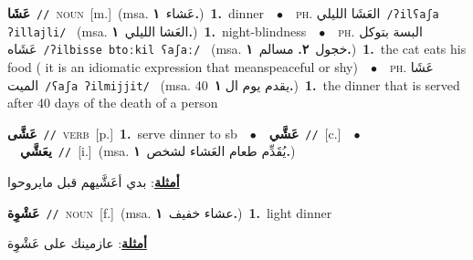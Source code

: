 \documentclass[10pt,a4paper,twoside]{article} %
\begin{document}
\begin{multicols}{2}
{\setlength\topsep{0pt}\textbf{\foreignlanguage{arabic}{عَشَا}}\ {\color{gray}\texttt{//}\color{black}}\ \textsc{noun}\ [m.]\ \color{gray}(msa. \foreignlanguage{arabic}{عَشاء}~\foreignlanguage{arabic}{\textbf{١.}})\color{black}\ \textbf{1.}~dinner\ \ $\bullet$\ \ \textsc{ph.} \color{gray} \foreignlanguage{arabic}{العَشَا الليلي}\color{black}\ {\color{gray}\texttt{/{\sffamily ʔilʕaʃa ʔillajli}/}\color{black}}\ \color{gray} (msa. \foreignlanguage{arabic}{العَشا الليلي}~\foreignlanguage{arabic}{\textbf{١.}})\color{black}\ \textbf{1.}~night-blindness\ \ $\bullet$\ \ \textsc{ph.} \color{gray} \foreignlanguage{arabic}{البسة بتوكل عَشَاه}\color{black}\ {\color{gray}\texttt{/{\sffamily ʔilbisse btoːkil ʕaʃaː}/}\color{black}}\ \color{gray} (msa. \foreignlanguage{arabic}{خجول}~\foreignlanguage{arabic}{\textbf{٢.}}  \foreignlanguage{arabic}{مسالم}~\foreignlanguage{arabic}{\textbf{١.}})\color{black}\ \textbf{1.}~the cat eats his food ( it is an idiomatic expression that meanspeaceful or shy)\ \ $\bullet$\ \ \textsc{ph.} \color{gray} \foreignlanguage{arabic}{عَشَا الميت}\color{black}\ {\color{gray}\texttt{/{\sffamily ʕaʃa ʔilmijjit}/}\color{black}}\ \color{gray} (msa. \foreignlanguage{arabic}{يقدم يوم ال 40}~\foreignlanguage{arabic}{\textbf{١.}})\color{black}\ \textbf{1.}~the dinner that is served after 40 days of the death of a person\ } \vspace{2mm}

{\setlength\topsep{0pt}\textbf{\foreignlanguage{arabic}{عَشَّى}}\ {\color{gray}\texttt{//}\color{black}}\ \textsc{verb}\ [p.]\ \textbf{1.}~serve dinner to sb\ \ $\bullet$\ \ \setlength\topsep{0pt}\textbf{\foreignlanguage{arabic}{عَشَّي}}\ {\color{gray}\texttt{//}\color{black}}\ [c.]\ \ $\bullet$\ \ \setlength\topsep{0pt}\textbf{\foreignlanguage{arabic}{يعَشَّي}}\ {\color{gray}\texttt{//}\color{black}}\ [i.]\ \color{gray}(msa. \foreignlanguage{arabic}{يُقَدِّم طعام العَشاء لشخص}~\foreignlanguage{arabic}{\textbf{١.}})\color{black}\  \begin{flushright}\color{gray}\foreignlanguage{arabic}{\textbf{\underline{\foreignlanguage{arabic}{أمثلة}}}: بدي أعَشَّيهم قبل مايروحوا}\end{flushright}\color{black}} \vspace{2mm}

{\setlength\topsep{0pt}\textbf{\foreignlanguage{arabic}{عَشْوِة}}\ {\color{gray}\texttt{//}\color{black}}\ \textsc{noun}\ [f.]\ \color{gray}(msa. \foreignlanguage{arabic}{عشاء خفيف}~\foreignlanguage{arabic}{\textbf{١.}})\color{black}\ \textbf{1.}~light dinner\  \begin{flushright}\color{gray}\foreignlanguage{arabic}{\textbf{\underline{\foreignlanguage{arabic}{أمثلة}}}: عازمينك على عَشْوِة}\end{flushright}\color{black}} \vspace{2mm}


\end{multicols}
\end{document}
